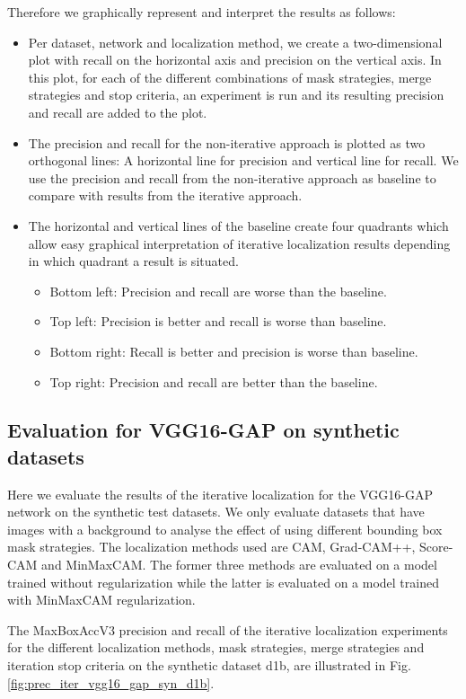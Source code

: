 Therefore we graphically represent and interpret the results as follows:
\begin{itemize}
    \item Per dataset, network and localization method, we create a two-dimensional plot with recall on the horizontal axis and precision on the vertical axis. In this plot, for each of the different combinations of mask strategies, merge strategies and stop criteria, an experiment is run and its resulting precision and recall are added to the plot.
    \item The precision and recall for the non-iterative approach is plotted as two orthogonal lines: A horizontal line for precision and vertical line for recall. We use the precision and recall from the non-iterative approach as baseline to compare with results from the iterative approach.
    \item The horizontal and vertical lines of the baseline create four quadrants which allow easy graphical interpretation of iterative localization results depending in which quadrant a result is situated.
    \begin{itemize}
        \item Bottom left: Precision and recall are worse than the baseline.
        \item Top left: Precision is better and recall is worse than baseline.
        \item Bottom right: Recall is better and precision is worse than baseline.
        \item Top right: Precision and recall are better than the baseline.
    \end{itemize}
\end{itemize}

\subsection{Evaluation for VGG16-GAP on synthetic datasets}
Here we evaluate the results of the iterative localization for the VGG16-GAP network on the synthetic test datasets. We only evaluate datasets that have images with a background to analyse the effect of using different bounding box mask strategies. The localization methods used are CAM, Grad-CAM++, Score-CAM and MinMaxCAM. The former three methods are evaluated on a model trained without regularization while the latter is evaluated on a model trained with MinMaxCAM regularization.

The MaxBoxAccV3 precision and recall of the iterative localization experiments for the different localization methods, mask strategies, merge strategies and iteration stop criteria on the synthetic dataset d1b, are illustrated in Fig. \ref{fig:prec_iter_vgg16_gap_syn_d1b}.

